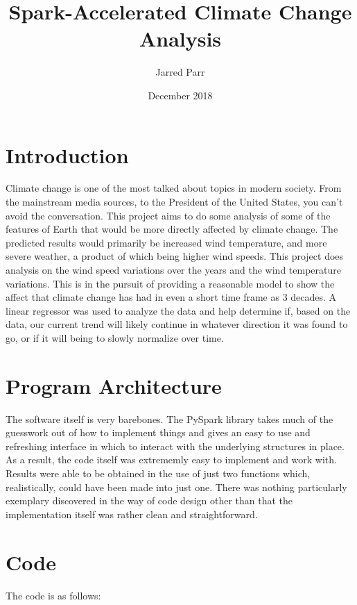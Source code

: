 \documentclass[11pt]{article}
\begin{document}
\title{Spark-Accelerated Climate Change Analysis}
\author{Jarred Parr}
\date{December 2018}
\maketitle

\section{Introduction}
Climate change is one of the most talked about topics in modern society. From the mainstream media sources, to the President of
the United States, you can't avoid the conversation. This project aims to do some analysis of some of the features of Earth that
would be more directly affected by climate change. The predicted results would primarily be increased wind temperature, and more
severe weather, a product of which being higher wind speeds. This project does analysis on the wind speed variations over the
years and the wind temperature variations. This is in the pursuit of providing a reasonable model to show the affect that climate
change has had in even a short time frame as 3 decades. A linear regressor was used to analyze the data and help determine if,
based on the data, our current trend will likely continue in whatever direction it was found to go, or if it will being to
slowly normalize over time.

\section{Program Architecture}
The software itself is very barebones. The PySpark library takes much of the guesswork out of how to implement things and gives
an easy to use and refreshing interface in which to interact with the underlying structures in place. As a result, the code itself
was extrememly easy to implement and work with. Results were able to be obtained in the use of just two functions which,
realistically, could have been made into just one. There was nothing particularly exemplary discovered in the way of code design
other than that the implementation itself was rather clean and straightforward.

\section{Code}
The code is as follows:
\end{document}

